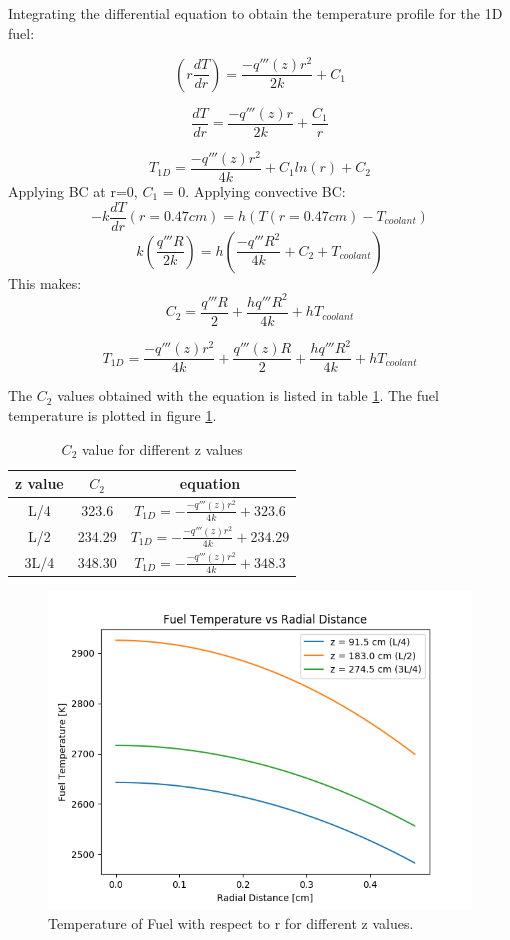 \documentclass[12pt,letterpaper]{article}
\begin{document}
Integrating the differential equation to obtain the temperature profile for the
1D fuel:


\[ (r \frac{dT}{dr}) = \frac{-q'''(z)r^2}{2k} + C_1 \]

\[ \frac{dT}{dr} = \frac{-q'''(z)r}{2k} + \frac{C_1}{r} \]

\[ T_{1D} = \frac{-q'''(z)r^2}{4k} + C_1 ln(r) + C_2 \]
Applying BC at r=0, $C_1$ = 0.
Applying convective BC:
\[ -k \frac{dT}{dr}(r= 0.47 cm) = h (T(r = 0.47 cm ) - T_{coolant})\]
\[ k( \frac{q'''R}{2k}) = h (\frac{-q'''R^2}{4k} + C_2 + T_{coolant})\]
This makes:
\[C_2 = \frac{q'''R}{2} + \frac{hq'''R^2}{4k} + hT_{coolant}\]

\[ T_{1D} = \frac{-q'''(z)r^2}{4k} + \frac{q'''(z)R}{2} + \frac{hq'''R^2}{4k} + hT_{coolant}\]


The $C_2$ values obtained with the equation is listed in table \ref{tab:c2}.
The fuel temperature is plotted in figure \ref{fig:t_f_r}.

\begin{table}[h]
     \centering
    \begin{tabular}{ccc}
       \hline
       z value & $C_2$ & equation \\
       \hline
       L/4 & 323.6  & $T_{1D} = -\frac{-q'''(z)r^2}{4k} + 323.6$ \\
       L/2 & 234.29 & $T_{1D} = -\frac{-q'''(z)r^2}{4k} + 234.29$ \\
       3L/4 & 348.30 & $T_{1D} = -\frac{-q'''(z)r^2}{4k} + 348.3$\\
       \hline
    \end{tabular}
    \caption {$C_2$ value for different z values}
    \label{tab:c2}
\end{table}


\begin{figure}[htbp!]
    \begin{center}
        \includegraphics[scale=0.7]{t_f_r.png}
    \end{center}
    \caption{Temperature of Fuel with respect to r for different z values.}
    \label{fig:t_f_r}
\end{figure}
\end{document}

